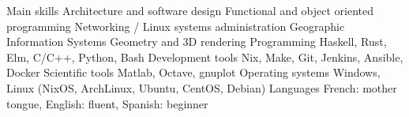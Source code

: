 \begin{cvskills}
  \cvskill
    {Main skills}
 	{
		Architecture and software design \newline
        Functional and object oriented programming \newline
        Networking / Linux systems administration \newline
        Geographic Information Systems \lastnewline
        Geometry and 3D rendering
	}
  \cvskill
    {Programming}
 	{Haskell, Rust, Elm, C/C++, Python, Bash}
  \cvskill
	{Development tools}
	{Nix, Make, Git, Jenkins, Ansible, Docker}
  \cvskill
	{Scientific tools}
	{Matlab, Octave, gnuplot}
  \cvskill
    {Operating systems}
 	{Windows, Linux (NixOS, ArchLinux, Ubuntu, CentOS, Debian)}
  \cvskill
    {Languages}
 	{
        French: mother tongue,
		English: fluent,
		Spanish: beginner
	}
\end{cvskills}

